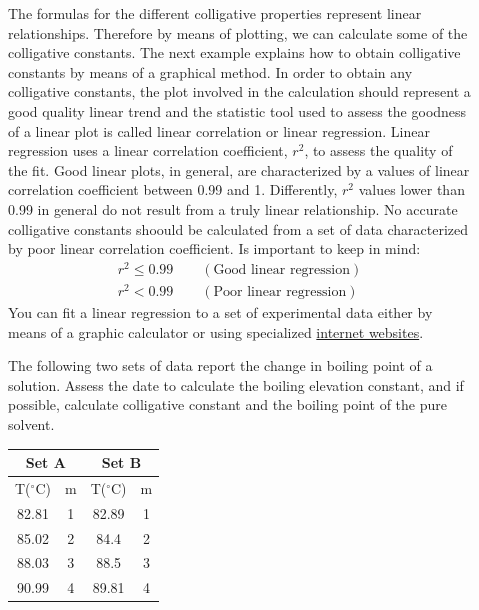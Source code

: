 \documentclass[main.tex]{subfiles}
\newcommand\chapterlabel{physicalsolutions}
\begin{document}
\begin{description}
\item[] 
The formulas for the different colligative properties represent linear relationships. Therefore by means of plotting, we can calculate some of the colligative constants. The next example explains how to obtain colligative constants by means of a graphical method. In order to obtain any colligative constants, the plot involved in the calculation should represent a good quality linear trend and the statistic tool used to assess the goodness of a linear plot is called linear correlation or linear regression. Linear regression uses a linear correlation coefficient, $r^2$, to assess the quality of the fit.
Good linear plots, in general, are characterized by a values of linear correlation coefficient between 0.99 and 1. Differently, $r^2$ values lower than 0.99 in general do not result from a truly linear relationship. No accurate colligative constants shoould be calculated from a set of data characterized by poor linear correlation coefficient. Is important to keep in mind:
\begin{equation}\begin{split}
r^2\leq0.99 \quad \quad (\text{Good linear regression})\label{\chapterlabel:equation16}\\
r^2<0.99 \quad \quad (\text{Poor linear regression}) 
\end{split}\end{equation}
You can fit a linear regression to a set of experimental data either by means of a graphic calculator or using specialized \href{http://www.alcula.com/calculators/statistics/linear-regression/#gsc.tab=0}{internet websites}.
\begin{example} %
The following two sets of data report the change in boiling point of a solution. Assess the date to calculate the boiling elevation constant, and if possible, calculate colligative constant and the boiling point of the pure solvent. 
\begin{center}\begin{tabular}[t]{  c c c c   }
\toprule
\multicolumn{2}{c}{Set A}&\multicolumn{2}{c}{Set B}\\
\toprule
  T($^{\circ}$C)	&m&T($^{\circ}$C)	&m\\
\midrule
 82.81	&1&	82.89	&1\\
 85.02	&2&	84.4	&2\\
 88.03	&3&	88.5	&3\\
 90.99	&4&	89.81	&4\\

\end{tabular}
\end{center}
\end{example}
\end{description}
\end{document}

